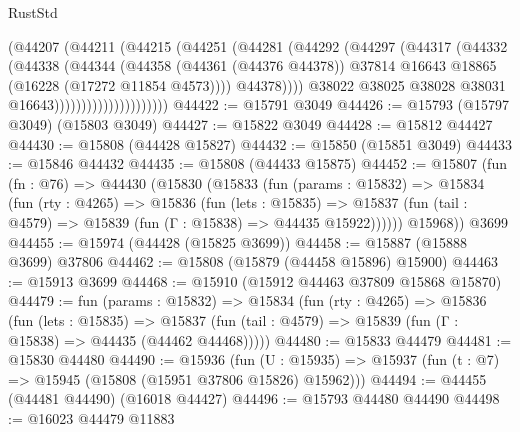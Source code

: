 \begin{lexlean}{RustStd}
\begin{coremodule}
                                  (@44207
                                    (@44211
                                      (@44215
                                        (@44251
                                          (@44281
                                            (@44292
                                              (@44297
                                                (@44317
                                                  (@44332
                                                    (@44338
                                                      (@44344
                                                        (@44358
                                                          (@44361 (@44376 @44378))
                                                          @37814
                                                          @16643
                                                          @18865
                                                          (@16228 (@17272 @11854 @4573))))
                                                      @44378))))
                                              @38022
                                              @38025
                                              @38028
                                              @38031
                                              @16643)))))))))))))))))))))
@44422 := @15791 @3049
@44426 := @15793 (@15797 @3049) (@15803 @3049)
@44427 := @15822 @3049
@44428 := @15812 @44427
@44430 := @15808 (@44428 @15827)
@44432 := @15850 (@15851 @3049)
@44433 := @15846 @44432
@44435 := @15808 (@44433 @15875)
@44452 := @15807
    (fun (fn : @76) =>
    @44430
      (@15830
        (@15833
          (fun (params : @15832) =>
          @15834
            (fun (rty : @4265) =>
            @15836
              (fun (lets : @15835) =>
              @15837 (fun (tail : @4579) => @15839 (fun (Γ : @15838) => @44435 @15922))))))
        @15968))
    @3699
@44455 := @15974 (@44428 (@15825 @3699))
@44458 := @15887 (@15888 @3699) @37806
@44462 := @15808 (@15879 (@44458 @15896) @15900)
@44463 := @15913 @3699
@44468 := @15910 (@15912 @44463 @37809 @15868 @15870)
@44479 := fun (params : @15832) =>
  @15834
    (fun (rty : @4265) =>
    @15836
      (fun (lets : @15835) =>
      @15837 (fun (tail : @4579) => @15839 (fun (Γ : @15838) => @44435 (@44462 @44468)))))
@44480 := @15833 @44479
@44481 := @15830 @44480
@44490 := @15936
    (fun (U : @15935) => @15937 (fun (t : @7) => @15945 (@15808 (@15951 @37806 @15826) @15962)))
@44494 := @44455 (@44481 @44490) (@16018 @44427)
@44496 := @15793 @44480 @44490
@44498 := @16023 @44479 @11883

\end{coremodule}
\end{lexlean}
